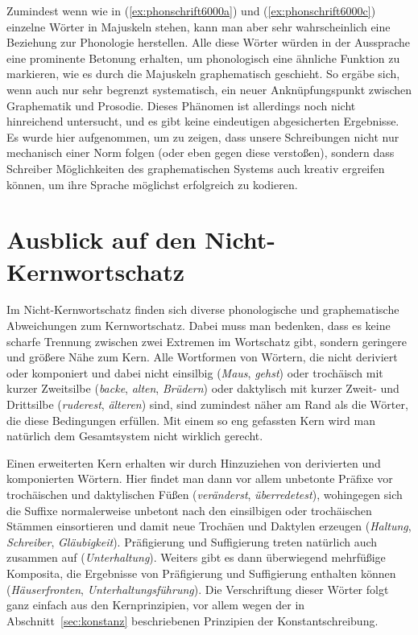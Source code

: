 Zumindest wenn wie in (\ref{ex:phonschrift6000a}) und (\ref{ex:phonschrift6000c}) einzelne Wörter in Majuskeln stehen, kann man aber sehr wahrscheinlich eine Beziehung zur Phonologie herstellen.
Alle diese Wörter würden in der Aussprache eine prominente Betonung erhalten, um phonologisch eine ähnliche Funktion zu markieren, wie es durch die Majuskeln graphematisch geschieht.
So ergäbe sich, wenn auch nur sehr begrenzt systematisch, ein neuer Anknüpfungspunkt zwischen Graphematik und Prosodie.
Dieses Phänomen ist allerdings noch nicht hinreichend untersucht, und es gibt keine eindeutigen abgesicherten Ergebnisse.
Es wurde hier aufgenommen, um zu zeigen, dass unsere Schreibungen nicht nur mechanisch einer Norm folgen (oder eben gegen diese verstoßen), sondern dass Schreiber Möglichkeiten des graphematischen Systems auch kreativ ergreifen können, um ihre Sprache möglichst erfolgreich zu kodieren.

\section{Ausblick auf den Nicht-Kernwortschatz}

\label{sec:nichtkernschreib}

Im Nicht-Kernwortschatz finden sich diverse phonologische und graphematische Abweichungen zum Kernwortschatz.
Dabei muss man bedenken, dass es keine scharfe Trennung zwischen zwei Extremen im Wortschatz gibt, sondern geringere und größere Nähe zum Kern.
Alle Wortformen von Wörtern, die nicht deriviert oder komponiert und dabei nicht einsilbig (\textit{Maus}, \textit{gehst}) oder trochäisch mit kurzer Zweitsilbe (\textit{backe}, \textit{alten}, \textit{Brüdern}) oder daktylisch mit kurzer Zweit- und Drittsilbe (\textit{ruderest}, \textit{älteren}) sind, sind zumindest näher am Rand als die Wörter, die diese Bedingungen erfüllen.
Mit einem so eng gefassten Kern wird man natürlich dem Gesamtsystem nicht wirklich gerecht.

Einen erweiterten Kern erhalten wir durch Hinzuziehen von derivierten und komponierten Wörtern.
Hier findet man dann vor allem unbetonte Präfixe vor trochäischen und daktylischen Füßen (\textit{veränderst}, \textit{überredetest}), wohingegen sich die Suffixe normalerweise unbetont nach den einsilbigen oder trochäischen Stämmen einsortieren und damit neue Trochäen und Daktylen erzeugen (\textit{Haltung}, \textit{Schreiber}, \textit{Gläubigkeit}).
Präfigierung und Suffigierung treten natürlich auch zusammen auf (\textit{Unterhaltung}).
Weiters gibt es dann überwiegend mehrfüßige Komposita, die Ergebnisse von Präfigierung und Suffigierung enthalten können (\textit{Häuserfronten}, \textit{Unterhaltungsführung}).
Die Verschriftung dieser Wörter folgt ganz einfach aus den Kernprinzipien, vor allem wegen der in Abschnitt~\ref{sec:konstanz} beschriebenen Prinzipien der Konstantschreibung.

